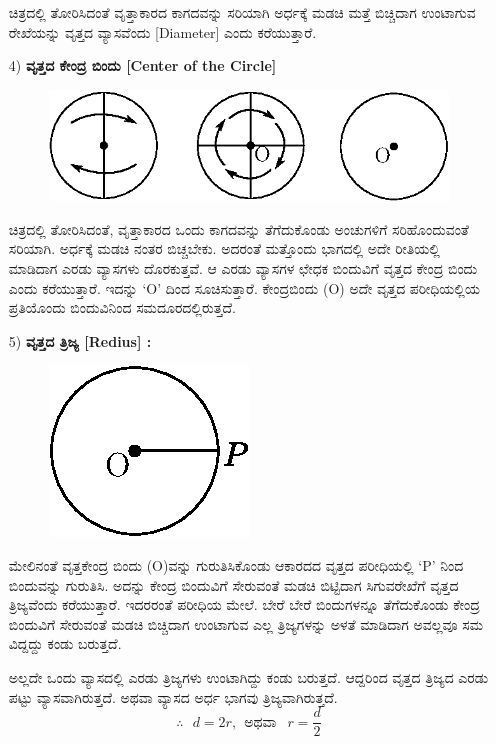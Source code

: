 \begin{enumerate}
 ಚಿತ್ರದಲ್ಲಿ ತೋರಿಸಿದಂತೆ ವೃತ್ತಾಕಾರದ ಕಾಗದವನ್ನು ಸರಿಯಾಗಿ ಅರ್ಧಕ್ಕೆ ಮಡಚಿ ಮತ್ತೆ ಬಿಚ್ಚಿದಾಗ ಉಂಟಾಗುವ ರೇಖೆಯನ್ನು ವೃತ್ತದ ವ್ಯಾಸವೆಂದು [Diameter] ಎಂದು ಕರೆಯುತ್ತಾರೆ. 

\item[4)] \textbf{ವೃತ್ತದ ಕೇಂದ್ರ ಬಿಂದು [Center of the Circle]}
\begin{figure}[H]
\centering
\includegraphics[scale=.98]{src/figure/chap1/fig1-24c.eps}
\end{figure}
 
 ಚಿತ್ರದಲ್ಲಿ ತೋರಿಸಿದಂತೆ, ವೃತ್ತಾಕಾರದ ಒಂದು ಕಾಗದವನ್ನು ತೆಗೆದುಕೊಂಡು ಅಂಚುಗಳಿಗೆ ಸರಿಹೊಂದುವಂತೆ ಸರಿಯಾಗಿ. ಅರ್ಧಕ್ಕೆ ಮಡಚಿ ನಂತರ ಬಿಚ್ಚಬೇಕು. ಅದರಂತೆ ಮತ್ತೊಂದು ಭಾಗದಲ್ಲಿ ಅದೇ ರೀತಿಯಲ್ಲಿ ಮಾಡಿದಾಗ ಎರಡು ವ್ಯಾಸಗಳು ದೊರಕುತ್ತವೆ. ಆ ಎರಡು ವ್ಯಾಸಗಳ ಛೇಧಕ ಬಿಂದುವಿಗೆ ವೃತ್ತದ ಕೇಂದ್ರ ಬಿಂದು ಎಂದು ಕರೆಯುತ್ತಾರೆ. ಇದನ್ನು `O' ದಿಂದ ಸೂಚಿಸುತ್ತಾರೆ. ಕೇಂದ್ರಬಿಂದು (O) ಅದೇ ವೃತ್ತದ ಪರೀಧಿಯಲ್ಲಿಯ ಪ್ರತಿಯೊಂದು ಬಿಂದುವಿನಿಂದ ಸಮದೂರದಲ್ಲಿರುತ್ತದೆ. 
 
\item[5)] \textbf{ವೃತ್ತದ ತ್ರಿಜ್ಯ [Redius] :}
\begin{figure}[H]
\centering
\includegraphics[scale=.98]{src/figure/chap1/fig1-24d.eps}
\end{figure}
	
 
 ಮೇಲಿನಂತೆ ವೃತ್ತಕೇಂದ್ರ ಬಿಂದು (O)ವನ್ನು ಗುರುತಿಸಿಕೊಂಡು ಆಕಾರದದ ವೃತ್ತದ ಪರೀಧಿಯಲ್ಲಿ `P' ನಿಂದ ಬಿಂದುವನ್ನು ಗುರುತಿಸಿ. ಅದನ್ನು ಕೇಂದ್ರ ಬಿಂದುವಿಗೆ ಸೇರುವಂತೆ ಮಡಚಿ ಬಿಟ್ಟಿದಾಗ ಸಿಗುವರೇಖೆಗೆ ವೃತ್ತದ ತ್ರಿಜ್ಯವೆಂದು ಕರೆಯುತ್ತಾರೆ. ಇದರರಂತೆ ಪರೀಧಿಯ ಮೇಲೆ.
  ಬೇರೆ ಬೇರೆ ಬಿಂದುಗಳನ್ನೂ ತೆಗೆದುಕೊಂಡು ಕೇಂದ್ರ ಬಿಂದುವಿಗೆ ಸೇರುವಂತೆ ಮಡಚಿ ಬಿಚ್ಚಿದಾಗ ಉಂಟಾಗುವ ಎಲ್ಲ ತ್ರಿಜ್ಯಗಳನ್ನು ಅಳತೆ ಮಾಡಿದಾಗ ಅವಲ್ಲವೂ ಸಮ ವಿದ್ದದ್ದು ಕಂಡು ಬರುತ್ತದೆ. 
  
  ಅಲ್ಲದೇ ಒಂದು ವ್ಯಾಸದಲ್ಲಿ ಎರಡು ತ್ರಿಜ್ಯಗಳು ಉಂಟಾಗಿದ್ದು ಕಂಡು ಬರುತ್ತದೆ. ಆದ್ದರಿಂದ ವೃತ್ತದ ತ್ರಿಜ್ಯದ ಎರಡು ಪಟ್ಟು ವ್ಯಾಸವಾಗಿರುತ್ತದೆ. ಅಥವಾ ವ್ಯಾಸದ ಅರ್ಧ ಭಾಗವು ತ್ರಿಜ್ಯವಾಗಿರುತ್ತದೆ. 
  $$
  \therefore~~~ d = 2 r ,~~ \text{ಅಥವಾ } ~~r = \dfrac{d}{2}
  $$
    \end{enumerate}

